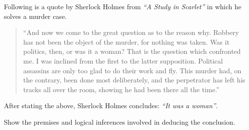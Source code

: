 \documentclass[a4paper]{exam}
\begin{document}
\begin{questions}
\begin{solution}
    \end{solution}

    Following is a quote by Sherlock Holmes from \textit{“A Study in Scarlet”} in which he solves a murder case.
    \begin{quote}
    ``And now we come to the great question as to the reason why. Robbery has not been the object of the murder, for nothing was taken. Was it politics, then, or was it a woman? That is the question which confronted me. I was inclined from the first to the latter supposition. Political assassins are only too glad to do their work and fly. This murder had, on the contrary, been done most deliberately, and the perpetrator has left his tracks all over the room, showing he had been there all the time.''
    \end{quote}
    After stating the above, Sherlock Holmes concludes: \textit{``It was a woman''}.

    Show the premises and logical inferences involved in deducing the conclusion.

    \begin{solution}
    \end{solution}

    

    
      
\end{questions}
\end{document}
